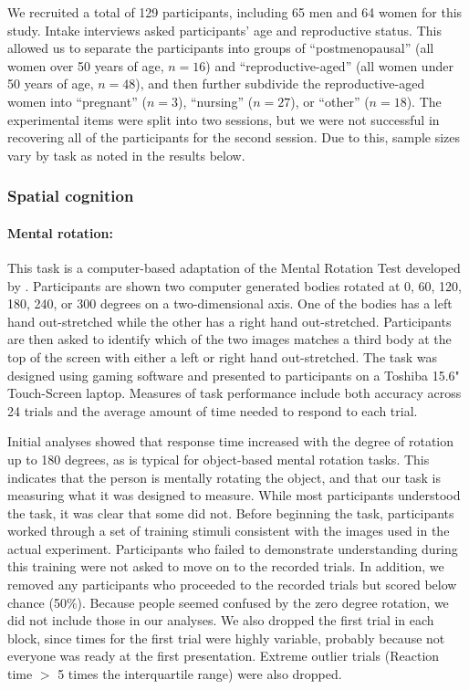 We recruited a total of 129 participants, including 65 men and 64 women for this study.  Intake interviews asked participants' age and reproductive status.  This allowed us to separate the participants into groups of ``postmenopausal'' (all women over 50 years of age, $n = 16$) and ``reproductive-aged'' (all women under 50 years of age, $n = 48$), and then further subdivide the reproductive-aged women into ``pregnant'' ($n = 3$), ``nursing'' ($n = 27$), or ``other'' ($n = 18$).  The experimental items were split into two sessions, but we were not successful in recovering all of the participants for the second session.  Due to this, sample sizes vary by task as noted in the results below.

		\subsubsection{Spatial cognition}
		\label{sec:2.2.1}		
\paragraph{Mental rotation:}  This task is a computer-based adaptation of the Mental Rotation Test developed by \citep{shepard1971mental}.  Participants are shown two computer generated bodies rotated at 0, 60, 120, 180, 240, or 300 degrees on a two-dimensional axis.  One of the bodies has a left hand out-stretched while the other has a right hand out-stretched.  Participants are then asked to identify which of the two images matches a third body at the top of the screen with either a left or right hand out-stretched.  The task was designed using gaming software \citep{unity14} and presented to participants on a Toshiba 15.6" Touch-Screen laptop.  Measures of task performance include both accuracy across 24 trials and the average amount of time needed to respond to each trial.

Initial analyses showed that response time increased with the degree of rotation up to 180 degrees, as is typical for object-based mental rotation tasks.  This indicates that the person is mentally rotating the object, and that our task is measuring what it was designed to measure. While most participants understood the task, it was clear that some did not. Before beginning the task, participants worked through a set of training stimuli consistent with the images used in the actual experiment.  Participants who failed to demonstrate understanding during this training were not asked to move on to the recorded trials.  In addition, we removed any participants who proceeded to the recorded trials but scored below chance (50\%).  Because people seemed confused by the zero degree rotation, we did not include those in our analyses.  We also dropped the first trial in each block, since times for the first trial were highly variable, probably because not everyone was ready at the first presentation. Extreme outlier trials (Reaction time $>$ 5 times the interquartile range) were also dropped.

